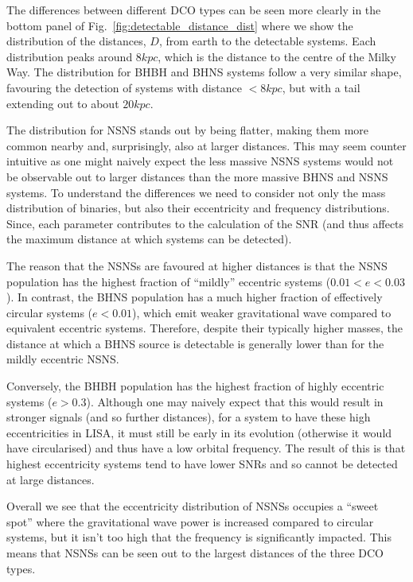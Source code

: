 The differences between different DCO types can be seen more clearly in the bottom panel of Fig.~\ref{fig:detectable_distance_dist} where we show the distribution of the distances, $D$, from earth to the detectable systems. Each distribution peaks around $8\unit{kpc}$, which is the distance to the centre of the Milky Way. The distribution for BHBH and BHNS systems follow a very similar shape, favouring the detection of systems with distance $<8\unit{kpc}$, but with a tail extending out to about $20\unit{kpc}$.

The distribution for NSNS stands out by being flatter, making them more common nearby and, surprisingly, also at larger distances. This may seem counter intuitive as one might naively expect the less massive NSNS systems would not be observable out to larger distances than the more massive BHNS and NSNS systems. To understand the differences we need to consider not only the mass distribution of binaries, but also their eccentricity and frequency distributions. Since, each parameter contributes to the calculation of the SNR (and thus affects the maximum distance at which systems can be detected).

The reason that the NSNSs are favoured at higher distances is that the NSNS population has the highest fraction of ``mildly'' eccentric systems ($0.01 < e < 0.03$). In contrast, the BHNS population has a much higher fraction of effectively circular systems ($e < 0.01$), which emit weaker gravitational wave compared to equivalent eccentric systems. Therefore, despite their typically higher masses, the distance at which a BHNS source is detectable is generally lower than for the mildly eccentric NSNS.

Conversely, the BHBH population has the highest fraction of highly eccentric systems ($e > 0.3$). Although one may naively expect that this would result in stronger signals (and so further distances), for a system to have these high eccentricities in LISA, it must still be early in its evolution (otherwise it would have circularised) and thus have a low orbital frequency. The result of this is that highest eccentricity systems tend to have lower SNRs and so cannot be detected at large distances. 

Overall we see that the eccentricity distribution of NSNSs occupies a ``sweet spot'' where the gravitational wave power is increased compared to circular systems, but it isn't too high that the frequency is significantly impacted. This means that NSNSs can be seen out to the largest distances of the three DCO types.

